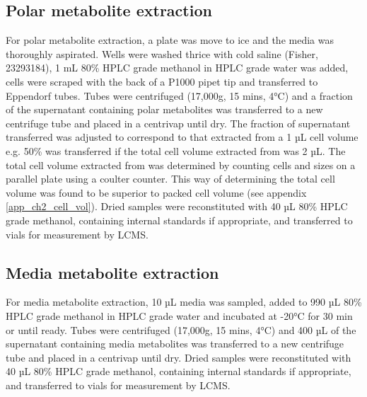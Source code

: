 \subsection{Polar metabolite extraction}
For polar metabolite extraction, a plate was move to ice and the media was thoroughly aspirated.
Wells were washed thrice with cold saline (Fisher, 23293184), 1 mL 80\% HPLC grade methanol in HPLC grade water was added, cells were scraped with the back of a P1000 pipet tip and transferred to Eppendorf tubes.
Tubes were centrifuged (17,000g, 15 mins, 4°C) and a fraction of the supernatant containing polar metabolites was transferred to a new centrifuge tube and placed in a centrivap until dry.
The fraction of supernatant transferred was adjusted to correspond to that extracted from a 1 µL cell volume e.g. 50\% was transferred if the total cell volume extracted from was 2 µL.
The total cell volume extracted from was determined by counting cells and sizes on a parallel plate using a coulter counter.
This way of determining the total cell volume was found to be superior to packed cell volume (see appendix \ref{app_ch2_cell_vol}).
Dried samples were reconstituted with 40 µL 80\% HPLC grade methanol, containing internal standards if appropriate, and transferred to vials for measurement by LCMS.


\subsection{Media metabolite extraction}
For media metabolite extraction, 10 µL media was sampled, added to 990 µL 80\% HPLC grade methanol in HPLC grade water and incubated at -20°C for 30 min or until ready.
Tubes were centrifuged (17,000g, 15 mins, 4°C) and 400 µL of the supernatant containing media metabolites was transferred to a new centrifuge tube and placed in a centrivap until dry.
Dried samples were reconstituted with 40 µL 80\% HPLC grade methanol, containing internal standards if appropriate, and transferred to vials for measurement by LCMS.


